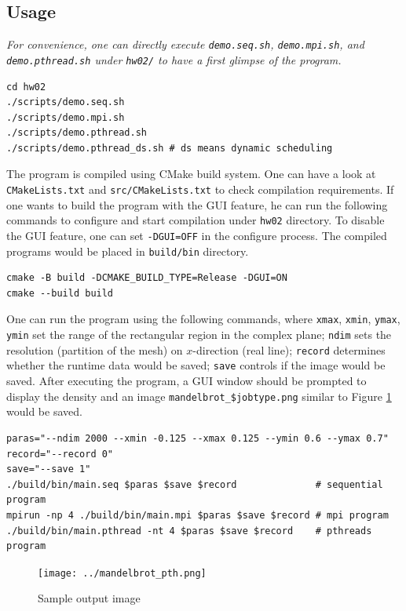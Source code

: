 \documentclass[twoside,12pt]{article}
\theoremstyle{definition}
\theoremstyle{remark}
\begin{document}
\subsection{Usage}
\textit{\color{red}
For convenience, one can directly execute \lstinline|demo.seq.sh|,
\lstinline|demo.mpi.sh|, and \lstinline|demo.pthread.sh| under 
\lstinline|hw02/| to have a first glimpse of the program.
}
\begin{lstlisting}[style=sh]
cd hw02
./scripts/demo.seq.sh
./scripts/demo.mpi.sh
./scripts/demo.pthread.sh
./scripts/demo.pthread_ds.sh # ds means dynamic scheduling
\end{lstlisting}

The program is compiled using CMake build system.
One can have a look at \lstinline|CMakeLists.txt| and \lstinline|src/CMakeLists.txt| 
to check compilation requirements.
If one wants to build the program with the GUI feature, he can run the following commands to
configure and start compilation under \lstinline|hw02| directory.
To disable the GUI feature, one can set \lstinline|-DGUI=OFF| in the configure process.
The compiled programs would be placed in \lstinline|build/bin| directory.
\begin{lstlisting}[style=sh]
cmake -B build -DCMAKE_BUILD_TYPE=Release -DGUI=ON
cmake --build build
\end{lstlisting}

One can run the program using the following commands,
where \lstinline|xmax|, \lstinline|xmin|, \lstinline|ymax|, \lstinline|ymin|
set the range of the rectangular region in the complex plane;
\lstinline|ndim| sets the resolution (partition of the mesh) on
$x$-direction (real line);
\lstinline|record| determines whether the runtime data would be saved;
\lstinline|save| controls if the image would be saved.
After executing the program,
a GUI window should be prompted to display the density
and an image \lstinline|mandelbrot_$jobtype.png| similar to 
Figure \ref{fig:image} would be saved.
\begin{lstlisting}[style=sh]
paras="--ndim 2000 --xmin -0.125 --xmax 0.125 --ymin 0.6 --ymax 0.7"
record="--record 0"
save="--save 1"
./build/bin/main.seq $paras $save $record              # sequential program
mpirun -np 4 ./build/bin/main.mpi $paras $save $record # mpi program   
./build/bin/main.pthread -nt 4 $paras $save $record    # pthreads program
\end{lstlisting}
\begin{figure}[h!]
    \centering
    \texttt{[image: ../mandelbrot\_pth.png]}
    \caption{Sample output image}
    \label{fig:image}
\end{figure}
\end{document}
